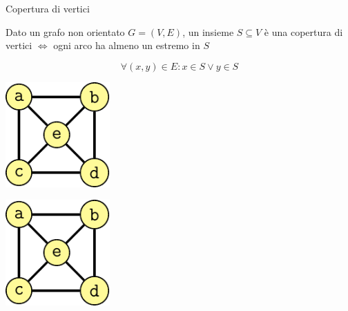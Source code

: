 \begin{frame}{Copertura di vertici}


\vspace{-9pt}
\begin{myboxtitle}
Dato un grafo non orientato $G=(V,E)$, un insieme
$S \subseteq V$ è una \alert{copertura di vertici} $\Leftrightarrow$ ogni arco ha almeno un  estremo in $S$

\vspace{-3pt}
\[
  \forall (x,y) \in E: x \in S \vee y \in S
\]
\end{myboxtitle}

\bigskip
\begin{overprint}
\begin{center}
\includegraphics[width=0.3\textwidth,page=1]{cover.pdf}
\end{center}
\begin{center}
\includegraphics[width=0.3\textwidth,page=2]{cover.pdf}
\end{center}
\end{overprint}

\end{frame}

